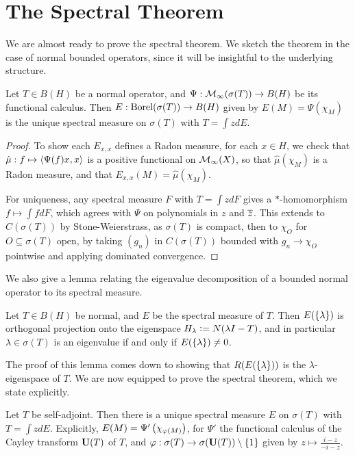 \documentclass[10pt]{amsart}
\begin{document}
\section{The Spectral Theorem}
We are almost ready to prove the spectral theorem. We sketch the theorem in the case of normal bounded operators, since it will be insightful to the underlying structure.
\begin{theorem}\label{specnorm}
    Let $T \in B(H)$ be a normal operator, and $\Psi : \mathcal{M}_\infty(\sigma(T)) \to B(H)$ be its functional calculus. Then $E : \operatorname{Borel}(\sigma(T)) \to B(H)$ given by $E(M) = \Psi(\chi_M)$ is the unique spectral measure on $\sigma(T)$ with $T = \int z dE$.
\end{theorem}
\begin{proof}
    To show each $E_{x, x}$ defines a Radon measure, for each $x \in H$, we check that $\hat\mu : f \mapsto \left\langle \Psi(f)x, x \right\rangle$ is a positive functional on $\mathcal{M}_\infty(X)$, so that $\hat\mu(\chi_M)$ is a Radon measure, and that $E_{x, x}(M) = \hat\mu(\chi_M)$.

    For uniqueness, any spectral measure $F$ with $T = \int z dF$ gives a $*$-homomorphism $f \mapsto \int f dF$, which agrees with $\Psi$ on polynomials in $z$ and $\overline{z}$. This extends to $C(\sigma(T))$ by Stone-Weierstrass, as $\sigma(T)$ is compact, then to $\chi_O$ for $O \subseteq \sigma(T)$ open, by taking $(g_n)$ in $C(\sigma(T))$ bounded with $g_n \to \chi_O$ pointwise and applying dominated convergence. 
\end{proof}
We also give a lemma relating the eigenvalue decomposition of a bounded normal operator to its spectral measure.
\begin{lemma}\label{bdnormaleigen}
    Let $T \in B(H)$ be normal, and $E$ be the spectral measure of $T$. Then $E(\left\{  \lambda  \right\})$ is orthogonal projection onto the eigenspace $H_\lambda \vcentcolon= N(\lambda I - T)$, and in particular $\lambda \in \sigma(T)$ is an eigenvalue if and only if $E(\left\{  \lambda  \right\}) \neq 0$.
\end{lemma}
The proof of this lemma comes down to showing that $R(E(\left\{  \lambda  \right\}))$ is the $\lambda$-eigenspace of $T$. We are now equipped to prove the spectral theorem, which we state explicitly.
\begin{theorem}
    Let $T$ be self-adjoint. Then there is a unique spectral measure $E$ on $\sigma(T)$ with $T = \int z dE$. Explicitly, $E(M) = \Psi'\left(  \chi_{\varphi(M)}  \right)$, for $\Psi'$ the functional calculus of the Cayley transform $\mathbf{U}(T)$ of $T$, and $\varphi : \sigma(T) \to \sigma(\mathbf{U}(T)) \setminus \left\{  1  \right\}$ given by $z \mapsto \frac{i - z}{-i - z}$.
\end{theorem}
\end{document}
